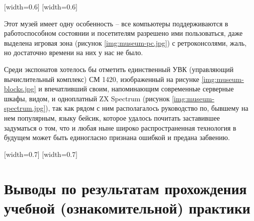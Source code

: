 \documentclass[variant=practice]{bsuir}
\begin{document}
[width=0.6\textwidth]
[width=0.6\textwidth]

Этот музей имеет одну особенность -- все компьютеры поддерживаются в
работоспособном состоянии и посетителям разрешено ими пользоваться, даже
выделена игровая зона (рисунок \ref{img:museum-pc.jpg}) с ретроконсолями, жаль,
но достаточно времени на них у нас не было.

Среди экспонатов хотелось бы отметить единственный УВК (управляющий
вычислительный комплекс) СМ 1420, изображенный на рисунке
\ref{img:museum-blocks.jpg} и впечатливший своим, напоминающим современные
серверные шкафы, видом, и одноплатный ZX Spectrum (рисунок
\ref{img:museum-spectrum.jpg}), так как рядом с ним располагалось руководство
по, бывшему на нем популярным, языку бейсик, которое удалось почитать
заставившее задуматься о том, что и любая ныне широко распространенная
технология в будущем может быть единогласно признана ошибкой и предана забвению.

[width=0.7\textwidth]
[width=0.7\textwidth]

\chapter*{Выводы по результатам прохождения учебной (ознакомительной) практики}



\end{document}
